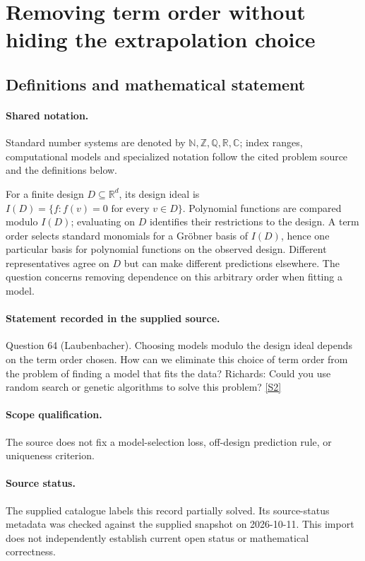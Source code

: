 \documentclass[11pt]{article}
\newcommand{\sref}[2]{\hyperlink{source:#1:#2}{[S#2]}}
\begin{document}
\section{Removing term order without hiding the extrapolation choice}\label{statement}

\subsection{Definitions and mathematical statement}

\paragraph{Shared notation.}Standard number systems are denoted by $\mathbb N,\mathbb Z,\mathbb Q,\mathbb R,\mathbb C$; index ranges, computational models and specialized notation follow the cited problem source and the definitions below.


For a finite design $D\subseteq\mathbb R^d$, its design ideal is $I(D)=\{f:f(v)=0\text{ for every }v\in D\}$. Polynomial functions are compared modulo $I(D)$; evaluating on $D$ identifies their restrictions to the design. A term order selects standard monomials for a Gröbner basis of $I(D)$, hence one particular basis for polynomial functions on the observed design. Different representatives agree on $D$ but can make different predictions elsewhere. The question concerns removing dependence on this arbitrary order when fitting a model.
\paragraph{Statement recorded in the supplied source.}
Question 64 (Laubenbacher). Choosing models modulo the design ideal depends on the term order chosen. How can we eliminate this choice of term order from the problem of finding a model that fits the data? Richards: Could you use random search or genetic algorithms to solve this problem? \sref{statement}{2}
\paragraph{Scope qualification.}
The source does not fix a model-selection loss, off-design prediction rule, or uniqueness criterion.
\paragraph{Source status.}
The supplied catalogue labels this record partially solved. Its source-status metadata was checked against the supplied snapshot on 2026-10-11. This import does not independently establish current open status or mathematical correctness.
\end{document}
